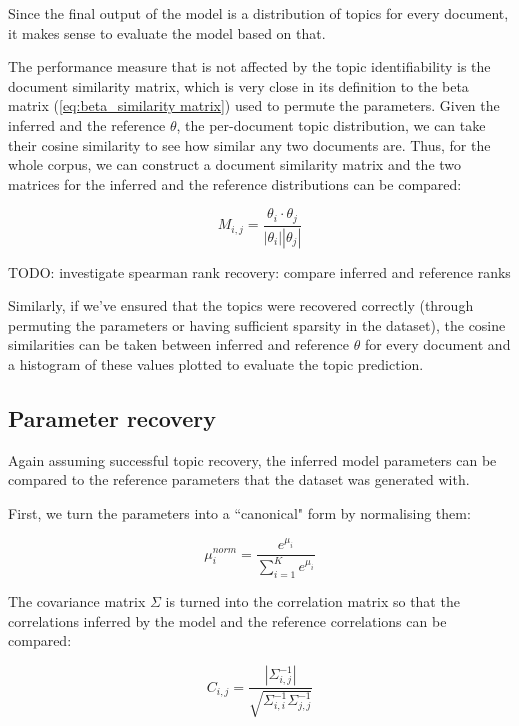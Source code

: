 \documentclass[12pt,a4paper,twoside,openright]{report}
\begin{document}
Since the final output of the model is a distribution of topics for every document, it makes sense to evaluate the model based on that.

The performance measure that is not affected by the topic identifiability is the document similarity matrix, which is very close in its definition to the beta matrix (\ref{eq:beta_similarity matrix}) used to permute the parameters. Given the inferred and the reference $\theta$, the per-document topic distribution, we can take their cosine similarity to see how similar any two documents are. Thus, for the whole corpus, we can construct a document similarity matrix and the two matrices for the inferred and the reference distributions can be compared:

\begin{equation}\label{eq:document_similarity_matrix}
M_{i,j} = \frac{\theta_i \cdot \theta_j}{|\theta_i||\theta_j|}
\end{equation}

TODO: investigate spearman rank recovery: compare inferred and reference ranks

Similarly, if we've ensured that the topics were recovered correctly (through permuting the parameters or having sufficient sparsity in the dataset), the cosine similarities can be taken between inferred and reference $\theta$ for every document and a histogram of these values plotted to evaluate the topic prediction.

\subsection{Parameter recovery}

Again assuming successful topic recovery, the inferred model parameters can be compared to the reference parameters that the dataset was generated with.

First, we turn the parameters into a ``canonical" form by normalising them:

\begin{equation}
\mu^{norm}_i = \frac{e^{\mu_i}}{\sum\limits_{i=1}^K{e^{\mu_i}}}
\end{equation}

The covariance matrix $\Sigma$ is turned into the correlation matrix so that the correlations inferred by the model and the reference correlations can be compared:

\begin{equation}
C_{i, j} = \frac{|\Sigma^{-1}_{i, j}|}{\sqrt{\Sigma^{-1}_{i, i}\Sigma^{-1}_{j, j}}}
\end{equation}
\end{document}
